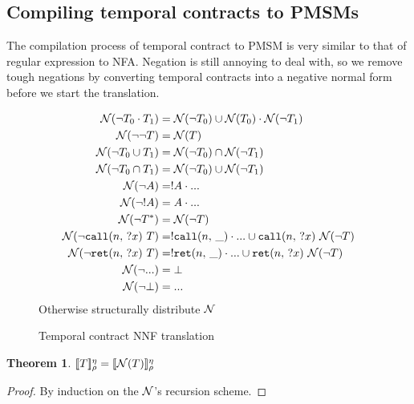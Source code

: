 \documentclass[preprint,onecolumn,9pt]{sigplanconf} %
\newtheorem{theorem}{Theorem}
\begin{document}
\subsection{Compiling temporal contracts to PMSMs}
%
The compilation process of temporal contract to PMSM is very similar to that of regular expression to NFA.
%
Negation is still annoying to deal with, so we remove tough negations by converting temporal contracts into a negative normal form before we start the translation.
%
\begin{figure}
  \begin{align*}
    {\mathcal N}(\neg T_0 \cdot T_1) &=
      {\mathcal N}(\neg T_0) \cup {\mathcal N}(T_0) \cdot {\mathcal N}(\neg T_1)
\\
    {\mathcal N}(\neg \neg T) &= {\mathcal N}(T)
\\
    {\mathcal N}(\neg T_0 \cup T_1) &= {\mathcal N}(\neg T_0) \cap {\mathcal N}(\neg T_1)
\\
    {\mathcal N}(\neg T_0 \cap T_1) &= {\mathcal N}(\neg T_0) \cup {\mathcal N}(\neg T_1)
\\
    {\mathcal N}(\neg A) &= ! A \cdot {\tt ...}
\\
    {\mathcal N}(\neg ! A) &= A \cdot {\tt ...}
\\
    {\mathcal N}(\neg T^*) &= {\mathcal N}(\neg T)
\\
    {\mathcal N}(\neg {\tt call}(n,\, {\tt ?}x)\ T) &= ! {\tt call}(n,\, \_) \cdot {\tt ...} \cup {\tt call}(n,\, {\tt ?}x)\ {\mathcal N}(\neg T)
\\
    {\mathcal N}(\neg {\tt ret}(n,\, {\tt ?}x)\ T) &= ! {\tt ret}(n,\, \_) \cdot {\tt ...} \cup {\tt ret}(n,\, {\tt ?}x)\ {\mathcal N}(\neg T)
\\
    {\mathcal N}(\neg {\tt ...}) &= \bot
\\
    {\mathcal N}(\neg \bot) &= {\tt ...}
  \end{align*}
  Otherwise structurally distribute ${\mathcal N}$
  \caption{Temporal contract NNF translation}
  \label{fig:nnf}
\end{figure}
\begin{theorem}
  $[\![ T ]\!]^{\eta}_{\rho} = [\![ {\mathcal N}(T) ]\!]^{\eta}_{\rho}$
\end{theorem}
\begin{proof}
  By induction on the ${\mathcal N}$'s recursion scheme.
\end{proof}
\end{document}
